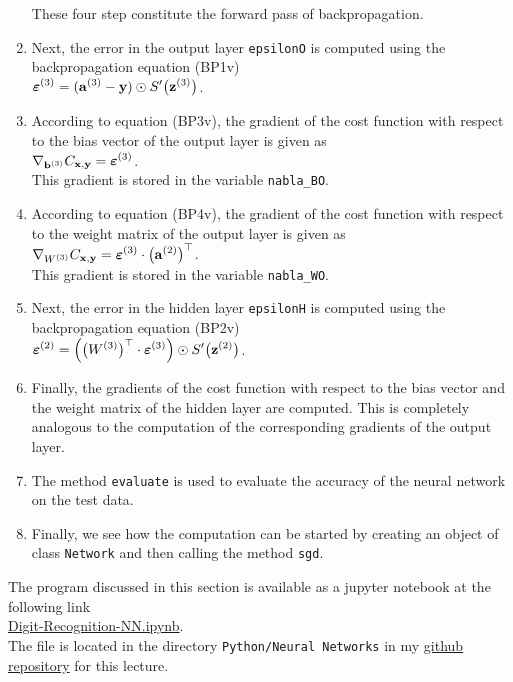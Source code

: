 \begin{enumerate}
      These four step constitute the forward pass of backpropagation.
\item Next, the error in the output layer \texttt{epsilonO} is computed using the backpropagation equation
      (BP1v)
      \\[0.2cm]
      \hspace*{1.3cm}
      $\displaystyle \boldsymbol{\varepsilon}^{(3)} = (\mathbf{a}^{(3)} - \mathbf{y}) \odot S'\bigl(\mathbf{z}^{(3)}\bigr)$.
\item According to  equation (BP3v), the gradient of the cost function with respect to the bias vector of the
      output layer is given as
      \\[0.2cm]
      \hspace*{1.3cm}
      $\displaystyle \nabla_{\mathbf{b}^{(3)}} C_{\mathbf{x}, \mathbf{y}} = \boldsymbol{\varepsilon}^{(3)}$.
      \\[0.2cm]
      This gradient is stored in the variable \texttt{nabla\_BO}.
\item According to equation (BP4v), the gradient  of the cost function with respect to the weight matrix of the
      output layer is given as
      \\[0.2cm]
      \hspace*{1.3cm}
      $\displaystyle \nabla_{W^{(3)}} C_{\mathbf{x}, \mathbf{y}} = \boldsymbol{\varepsilon}^{(3)} \cdot \bigl(\mathbf{a}^{(2)}\bigr)^\top$.
      \\[0.2cm]
      This gradient is stored in the variable \texttt{nabla\_WO}.
\item Next, the error in the hidden layer \texttt{epsilonH} is computed using the backpropagation equation
      (BP2v)
      \\[0.2cm]
      \hspace*{1.3cm}
      $\displaystyle \boldsymbol{\varepsilon}^{(2)} = \Bigl(\bigl(W^{(3)}\bigr)^\top \cdot \boldsymbol{\varepsilon}^{(3)}\Bigr) \odot
           S'\bigl(\mathbf{z}^{(2)}\bigr)
      $.
\item Finally, the gradients of the cost function with respect to the bias
      vector and the weight matrix of the hidden layer are computed.  This is completely analogous to the computation of
      the corresponding gradients of the output layer.
\item The method \texttt{evaluate} is used to evaluate the accuracy of the neural network on the test data.
\item Finally, we see how the computation can be started by creating an object of class \texttt{Network} and
      then calling the method \texttt{sgd}.
\end{enumerate}
The program discussed in this section is available as a jupyter notebook at the following link
\\[0.2cm]
\hspace*{1.3cm}
\href{https://github.com/karlstroetmann/Artificial-Intelligence/blob/master/Python/7%20Neural%20Networks/Digit-Recognition.ipynb}{Digit-Recognition-NN.ipynb}.
\\[0.2cm]
The file is located in the directory \texttt{Python/Neural Networks} in my
\href{https://github.com/karlstroetmann/Artificial-Intelligence}{github repository} for this lecture. 




